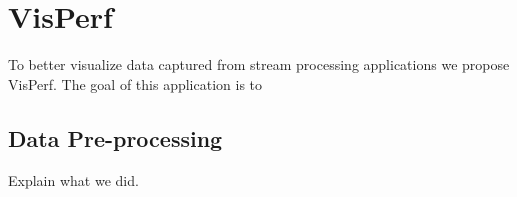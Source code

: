 \section{VisPerf}

To better visualize data captured from stream processing applications we propose VisPerf. The goal of this application is to

\subsection{Data Pre-processing}

Explain what we did.
